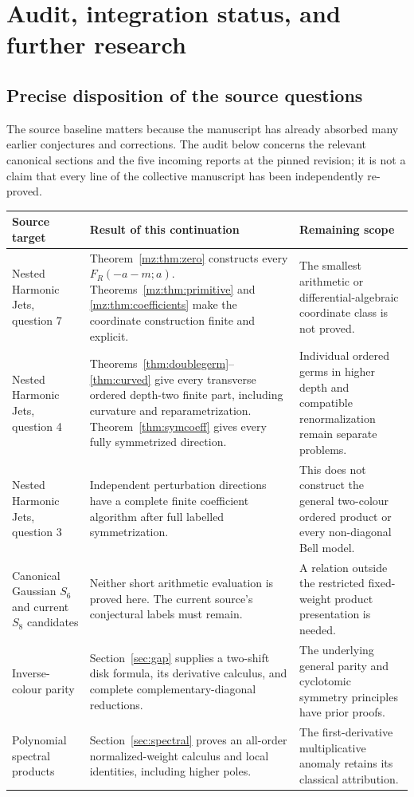 \section{Audit, integration status, and further research}
\label{sec:audit}

\subsection{Precise disposition of the source questions}

The source baseline matters because the manuscript has already absorbed
many earlier conjectures and corrections. The audit below concerns the
relevant canonical sections and the five incoming reports at the pinned
revision; it is not a claim that every line of the collective manuscript
has been independently re-proved.

\begin{longtable}{@{}>{\raggedright\arraybackslash}p{}>{\raggedright\arraybackslash}p{}>{\raggedright\arraybackslash}p{}@{}}
\toprule Source target & Result of this continuation & Remaining scope\\\midrule
\endhead
Nested Harmonic Jets, question 7 &
Theorem~\ref{mz:thm:zero} constructs every $F_R(-a-m;a)$.
Theorems~\ref{mz:thm:primitive} and \ref{mz:thm:coefficients} make the
coordinate construction finite and explicit. &
The smallest arithmetic or differential-algebraic coordinate class is
not proved.\\[5pt]
Nested Harmonic Jets, question 4 &
Theorems~\ref{thm:doublegerm}--\ref{thm:curved} give every transverse
ordered depth-two finite part, including curvature and reparametrization.
Theorem~\ref{thm:symcoeff} gives every fully symmetrized direction. &
Individual ordered germs in higher depth and compatible renormalization
remain separate problems.\\[5pt]
Nested Harmonic Jets, question 3 &
Independent perturbation directions have a complete finite coefficient
algorithm after full labelled symmetrization. &
This does not construct the general two-colour ordered product or every
non-diagonal Bell model.\\[5pt]
Canonical Gaussian $S_6$ and current $S_8$ candidates &
Neither short arithmetic evaluation is proved here. The current
source's conjectural labels must remain. &
A relation outside the restricted fixed-weight product presentation is
needed.\\[5pt]
Inverse-colour parity &
Section~\ref{sec:gap} supplies a two-shift disk formula, its derivative
calculus, and complete complementary-diagonal reductions. &
The underlying general parity and cyclotomic symmetry principles have
prior proofs.\\[5pt]
Polynomial spectral products &
Section~\ref{sec:spectral} proves an all-order normalized-weight calculus
and local identities, including higher poles. &
The first-derivative multiplicative anomaly retains its classical
attribution.\\
\bottomrule
\end{longtable}


